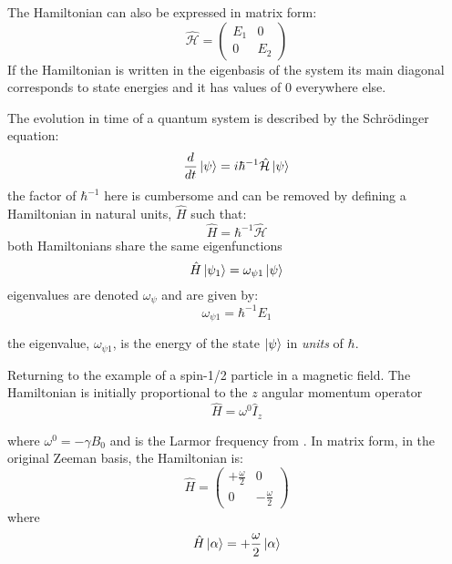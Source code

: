 The Hamiltonian can also be expressed in matrix form:
\begin{equation}
  \hat{\mathcal{H}} = \begin{pmatrix}
    E_1 & 0\\
    0 & E_2
\end{pmatrix}
\end{equation}
If the Hamiltonian is written in the eigenbasis of the system its main diagonal corresponds to state energies and it has values of $0$ everywhere else.

The evolution in time of a quantum system is described by the Schr\"odinger equation:
\begin{equation}
  \frac{d}{dt}\ket{\psi} = i\hbar^{-1}\hat{\mathcal{H}}\ket{\psi}
\end{equation}
the factor of $\hbar^{-1}$ here is cumbersome and can be removed by defining a Hamiltonian in natural units, $\hat{H}$
such that:
\begin{equation}
  \hat{H} = \hbar^{-1}\hat{\mathcal{H}}
\end{equation}
both Hamiltonians share the same eigenfunctions
\begin{equation}
  \hat{H}\ket{\psi_1} = \omega_{\psi1}\ket{\psi}
\end{equation}
eigenvalues are denoted $\omega_{\psi}$ and are given by:
\begin{equation}
  \omega_{\psi1} = \hbar^{-1}E_1
\end{equation}

the eigenvalue, $\omega_{\psi1}$, is the energy of the state $\ket{\psi}$ in \textit{units} of $\hbar$.

Returning to the example of a spin-1/2 particle in a magnetic field. The Hamiltonian is initially
proportional to the $z$ angular momentum operator
\begin{equation}
  \hat{H} = \omega^0\hat{I}_z
\end{equation}

where $\omega^0 = -\gamma B_0$ and is the Larmor frequency from . In matrix form, in the original Zeeman basis, the Hamiltonian is:
\begin{equation}
  \hat{H} = \begin{pmatrix}
+\frac{\omega}{2} & 0\\
0 & -\frac{\omega}{2}
\end{pmatrix}
\end{equation}
where
\begin{equation}
  \hat{H}\ket{\alpha} = +\frac{\omega}{2}\ket{\alpha}
\end{equation}

